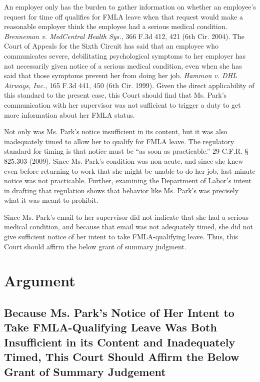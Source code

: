 An employer only has the burden to gather information on whether an employee's request for time off qualifies for FMLA leave when that request would make a reasonable employer think the employee had a serious medical condition. \emph{Brenneman v. MedCentral Health Sys.}, 366 F.3d 412, 421 (6th Cir. 2004). The Court of Appeals for the Sixth Circuit has said that an employee who communicates severe, debilitating psychological symptoms to her employer has not necessarily given notice of a serious medical condition, even when she has said that those symptoms prevent her from doing her job. \emph{Hammon v. DHL Airways, Inc.}, 165 F.3d 441, 450 (6th Cir. 1999). Given the direct applicability of this standard to the present case, this Court should find that Ms. Park's communication with her supervisor was not sufficient to trigger a duty to get more information about her FMLA status.

Not only was Ms. Park's notice insufficient in its content, but it was also inadequately timed to allow her to qualify for FMLA leave. The regulatory standard for timing is that notice must be ``as soon as practicable.'' 29 C.F.R. § 825.303 (2009). Since Ms. Park's condition was non-acute, and since she knew even before returning to work that she might be unable to do her job, last minute notice was not practicable. Further, examining the Department of Labor's intent in drafting that regulation shows that behavior like Ms. Park's was precisely what it was meant to prohibit.

Since Ms. Park's email to her supervisor did not indicate that she had a serious medical condition, and because that email was not adequately timed, she did not give sufficient notice of her intent to take FMLA-qualifying leave. Thus, this Court should affirm the below grant of summary judgment.

\part{Argument}
\label{argument}

\chapter{Because Ms. Park's Notice of Her Intent to Take FMLA-Qualifying Leave Was Both Insufficient in its Content and Inadequately Timed, This Court Should Affirm the Below Grant of Summary Judgement}
\label{becausems.parksnoticeofherintenttotakefmla-qualifyingleavewasbothinsufficientinitscontentandinadequatelytimedthiscourtshouldaffirmthebelowgrantofsummaryjudgement}

